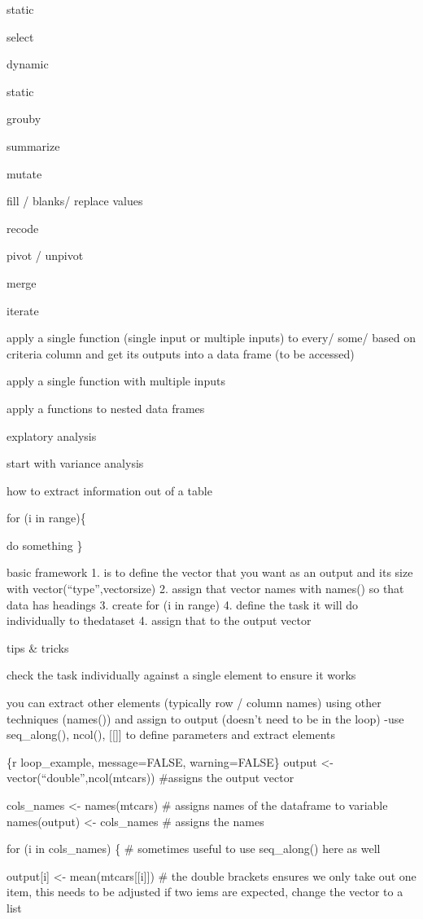 \documentclass[
  letterpaper,
  DIV=11,
  numbers=noendperiod]{scrreprt}
\begin{document}
static

select

dynamic

static

grouby

summarize

mutate

fill / blanks/ replace values

recode

pivot / unpivot

merge

iterate

apply a single function (single input or multiple inputs) to every/
some/ based on criteria column and get its outputs into a data frame (to
be accessed)

apply a single function with multiple inputs

apply a functions to nested data frames

explatory analysis

start with variance analysis

how to extract information out of a table

for (i in range)\{

do something \}

basic framework 1. is to define the vector that you want as an output
and its size with vector(``type'',vectorsize) 2. assign that vector
names with names() so that data has headings 3. create for (i in range)
4. define the task it will do individually to thedataset 4. assign that
to the output vector

tips \& tricks

check the task individually against a single element to ensure it works

you can extract other elements (typically row / column names) using
other techniques (names()) and assign to output (doesn't need to be in
the loop) -use seq\_along(), ncol(), {[}{[}{]}{]} to define parameters
and extract elements

\{r loop\_example, message=FALSE, warning=FALSE\} output \textless-
vector(``double'',ncol(mtcars)) \#assigns the output vector

cols\_names \textless- names(mtcars) \# assigns names of the dataframe
to variable names(output) \textless- cols\_names \# assigns the names

for (i in cols\_names) \{ \# sometimes useful to use seq\_along() here
as well

output{[}i{]} \textless- mean(mtcars{[}{[}i{]}{]}) \# the double
brackets ensures we only take out one item, this needs to be adjusted if
two iems are expected, change the vector to a list
\end{document}
